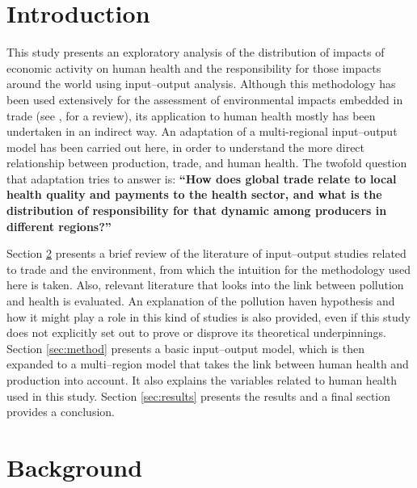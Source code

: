 \documentclass[a4paper,12pt, ]{article}
\begin{document}
\section{Introduction}


This study presents an exploratory analysis of the distribution of impacts of economic activity on human health and the responsibility for those impacts around the world using input--output analysis. Although this methodology has been used extensively for the assessment of environmental impacts embedded in trade (see \citealp{wiedmannexamining2007}, for a review), its application to human health mostly has been undertaken in an indirect way. An adaptation of a multi-regional input--output model has been carried out here, in order to understand the more direct relationship between production, trade, and human health. The twofold question that adaptation tries to answer is: \textbf{``How does global trade relate to local health quality and payments to the health sector, and what is the distribution of responsibility for that dynamic among producers in different regions?''}

Section \ref{sec:bg} presents a brief review of the literature of input--output studies related to trade and the environment, from which the intuition for the methodology used here is taken. Also, relevant literature that looks into the link between pollution and health is evaluated. An explanation of the pollution haven hypothesis and how it might play a role in this kind of studies is also provided, even if this study does not explicitly set out to prove or disprove its theoretical underpinnings. Section \ref{sec:method} presents a basic input--output model, which is then expanded to a multi--region model that takes the link between human health and production into account. It also explains the variables related to human health used in this study. Section \ref{sec:results} presents the results and a final section provides a conclusion.


\section{Background}
\label{sec:bg}
\end{document}
